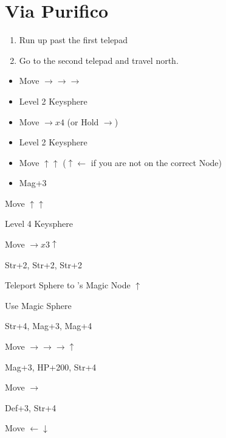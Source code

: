 \chapter{Via Purifico}

\begin{enumerate}
    \item Run up past the first telepad
    \item Go to the second telepad and travel north.
\end{enumerate}
\bothvfill
\winvfill
\begin{spheregrid}
    \begin{itemize}
        \auronf
        \begin{itemize}
            \item Move $\rightarrow\rightarrow\rightarrow$
            \item Level 2 Keysphere
            \item Move $\rightarrow x4$ (or Hold $\rightarrow$)
            \item Level 2 Keysphere
            \item Move $\uparrow\uparrow$ ($\uparrow\leftarrow$ if you are not on the correct Node)
            \item Mag+3
        \end{itemize}
        \yunaf
        \begin{itemize}
            \begin{multicols}{2}
                \item Move $\uparrow\uparrow$
                \item Level 4 Keysphere
                \item Move $\rightarrow x3 \uparrow$
                \item Str+2, Str+2, Str+2
                \item Teleport Sphere to \auron's Magic Node $\uparrow$
                \item Use Magic Sphere
                \item Str+4, Mag+3, Mag+4
                \item Move $\rightarrow\rightarrow\rightarrow\uparrow$
                \item Mag+3, HP+200, Str+4
                \item Move $\rightarrow$
                \item Def+3, Str+4
                \item Move $\leftarrow\downarrow$

\end{multicols}
\end{itemize}
\end{itemize}
\end{spheregrid}
